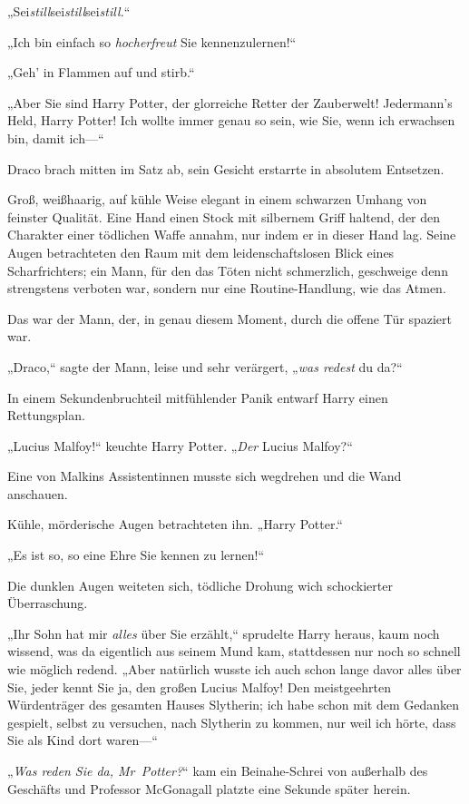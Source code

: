 {„Sei\emph{still}sei\emph{still}sei\emph{still.}“

„Ich bin einfach so \emph{hocherfreut} Sie kennenzulernen!“

„Geh' in Flammen auf und stirb.“

„Aber Sie sind Harry Potter, der glorreiche Retter der Zauberwelt! Jedermann's Held, Harry Potter! Ich wollte immer genau so sein, wie Sie, wenn ich erwachsen bin, damit ich—“

Draco brach mitten im Satz ab, sein Gesicht erstarrte in absolutem Entsetzen.

Groß, weißhaarig, auf kühle Weise elegant in einem schwarzen Umhang von feinster Qualität. Eine Hand einen Stock mit silbernem Griff haltend, der den Charakter einer tödlichen Waffe annahm, nur indem er in dieser Hand lag. Seine Augen betrachteten den Raum mit dem leidenschaftslosen Blick eines Scharfrichters; ein Mann, für den das Töten nicht schmerzlich, geschweige denn strengstens verboten war, sondern nur eine Routine-Handlung, wie das Atmen.

Das war der Mann, der, in genau diesem Moment, durch die offene Tür spaziert war.

„Draco,“ sagte der Mann, leise und sehr verärgert, „\emph{was redest} du da?“

In einem Sekundenbruchteil mitfühlender Panik entwarf Harry einen Rettungsplan.

„Lucius Malfoy!“ keuchte Harry Potter. „\emph{Der} Lucius Malfoy?“

Eine von Malkins Assistentinnen musste sich wegdrehen und die Wand anschauen.

Kühle, mörderische Augen betrachteten ihn. „Harry Potter.“

„Es ist so, so eine Ehre Sie kennen zu lernen!“

Die dunklen Augen weiteten sich, tödliche Drohung wich schockierter Überraschung.

„Ihr Sohn hat mir \emph{alles} über Sie erzählt,“ sprudelte Harry heraus, kaum noch wissend, was da eigentlich aus seinem Mund kam, stattdessen nur noch so schnell wie möglich redend. „Aber natürlich wusste ich auch schon lange davor alles über Sie, jeder kennt Sie ja, den großen Lucius Malfoy! Den meistgeehrten Würdenträger des gesamten Hauses Slytherin; ich habe schon mit dem Gedanken gespielt, selbst zu versuchen, nach Slytherin zu kommen, nur weil ich hörte, dass Sie als Kind dort waren—“

„\emph{Was reden Sie da, Mr~Potter?}“ kam ein Beinahe-Schrei von außerhalb des Geschäfts und Professor McGonagall platzte eine Sekunde später herein.

}
